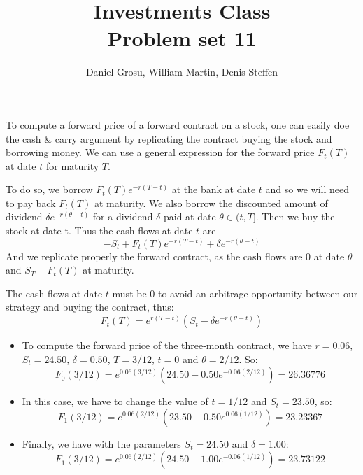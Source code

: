 \documentclass[10pt]{article}
\newenvironment{exercise}[2][Exercise]{\begin{trivlist}
  \item[\hskip \labelsep {\bfseries #1}\hskip \labelsep {\bfseries #2.}]}{\end{trivlist}}
\begin{document}
  \pagecolor{solar}
	
  \renewcommand{\qedsymbol}{\smiley}
	\title{Investments Class \\ Problem set 11}
	\author{Daniel Grosu, William Martin, Denis Steffen}
		
\maketitle

\begin{exercise} 1
  To compute a forward price of a forward contract on a stock, one can easily doe the cash \& carry argument by replicating the contract buying the stock and borrowing money. We can use a general expression for the forward price $F_t(T)$ at date $t$ for maturity $T$. 

  To do so, we borrow $F_t(T)e^{-r(T-t)}$ at the bank at date $t$ and so we will need to pay back $F_t(T)$ at maturity. We also borrow the discounted amount of dividend $\delta e^{-r(\theta-t)}$ for a dividend $\delta$ paid at date $\theta \in (t,T]$. Then we buy the stock at date t. Thus the cash flows at date $t$ are $$ -S_t + F_t(T)e^{-r(T-t)} + \delta e^{-r(\theta-t)}$$
  And we replicate properly the forward contract, as the cash flows are $0$ at date $\theta$ and $S_T - F_t(T)$ at maturity. 

  The cash flows at date $t$ must be $0$ to avoid an arbitrage opportunity between our strategy and buying the contract, thus: 
  $$ F_t(T) = e^{r(T-t)}(S_t - \delta e^{-r(\theta-t)})$$

  \begin{itemize}
    \item[(a)]
    To compute the forward price of the three-month contract, we have $r = 0.06$, $S_t = 24.50$, $\delta = 0.50$, $T = 3/12$, $t=0$ and $\theta = 2/12$. 
    So: 
    $$ F_0(3/12) = e^{0.06(3/12)}(24.50 - 0.50 e^{-0.06(2/12)}) = 26.36776 $$
     
    \item[(b)] 
    In this case, we have to change the value of $t = 1/12$ and $S_t = 23.50$, so:
    $$F_1(3/12) = e^{0.06(2/12)}(23.50 - 0.50e^{0.06(1/12)}) = 23.23367$$
    \item[(c)]  
    Finally, we have with the parameters $S_t = 24.50$ and $\delta = 1.00$: 
    $$ F_1(3/12) = e^{0.06(2/12)}(24.50 - 1.00e^{-0.06(1/12)}) = 23.73122 $$
  \end{itemize}


\end{exercise}
\end{document}
